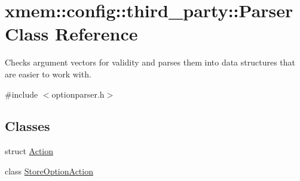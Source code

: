 \hypertarget{classxmem_1_1config_1_1third__party_1_1_parser}{}\section{xmem\+:\+:config\+:\+:third\+\_\+party\+:\+:Parser Class Reference}
\label{classxmem_1_1config_1_1third__party_1_1_parser}


Checks argument vectors for validity and parses them into data structures that are easier to work with.  




{\ttfamily \#include $<$optionparser.\+h$>$}

\subsection*{Classes}
\begin{DoxyCompactItemize}
\item 
struct \hyperlink{structxmem_1_1config_1_1third__party_1_1_parser_1_1_action}{Action}
\item 
class \hyperlink{classxmem_1_1config_1_1third__party_1_1_parser_1_1_store_option_action}{Store\+Option\+Action}
\end{DoxyCompactItemize}
